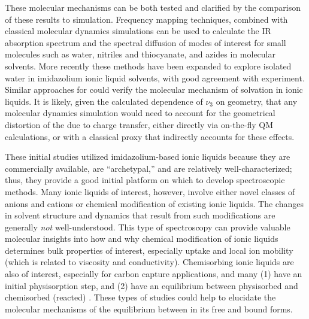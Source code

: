 \documentclass[%
  class = book,%
  crop = false,%
  float = true,%
  multi = true,%
  preview = false,%
]{standalone}
\begin{document}
{These molecular mechanisms can be both tested and clarified by the comparison of these results to simulation. Frequency mapping techniques, combined with classical molecular dynamics simulations can be used to calculate the IR absorption spectrum and the spectral diffusion of modes of interest for small molecules such as water,\cite{steinelCPL-04,Asbury2004,Corcelli2004} nitriles and thiocyanate,\cite{Choi2008,Lindquist2008} and azides\cite{liJPC-06,Li2006} in molecular solvents. More recently these methods have been expanded to explore isolated water in imidazolium ionic liquid solvents\cite{Terranova2014}, with good agreement with experiment.\cite{wongJPCB-13} Similar approaches for  could verify the molecular mechanism of  solvation in ionic liquids. It is likely, given the calculated dependence of \(\nu_3\) on  geometry, that any molecular dynamics simulation would need to account for the geometrical distortion of the  due to charge transfer, either directly via on-the-fly QM calculations, or with a classical proxy that indirectly accounts for these effects.

These initial studies utilized imidazolium-based ionic liquids because they are commercially available, are ``archetypal,'' and are relatively well-characterized; thus, they provide a good initial platform on which to develop spectroscopic methods. Many ionic liquids of interest, however, involve either novel classes of anions and cations or chemical modification of existing ionic liquids. The changes in solvent structure and dynamics that result from such modifications are generally \textit{not} well-understood. This type of spectroscopy can provide valuable molecular insights into how and why chemical modification of ionic liquids determines bulk properties of interest, especially  uptake and local ion mobility (which is related to viscosity and conductivity). Chemisorbing ionic liquids are also of interest, especially for carbon capture applications, and many (1) have an initial physisorption step, and (2) have an equilibrium between physisorbed and chemisorbed (reacted) . These types of studies could help to elucidate the molecular mechanisms of the equilibrium between  in its free and bound forms.

\section{\texorpdfstring{}{Conclusions}}
\label{sec:anions_conclusions}

}
\end{document}
